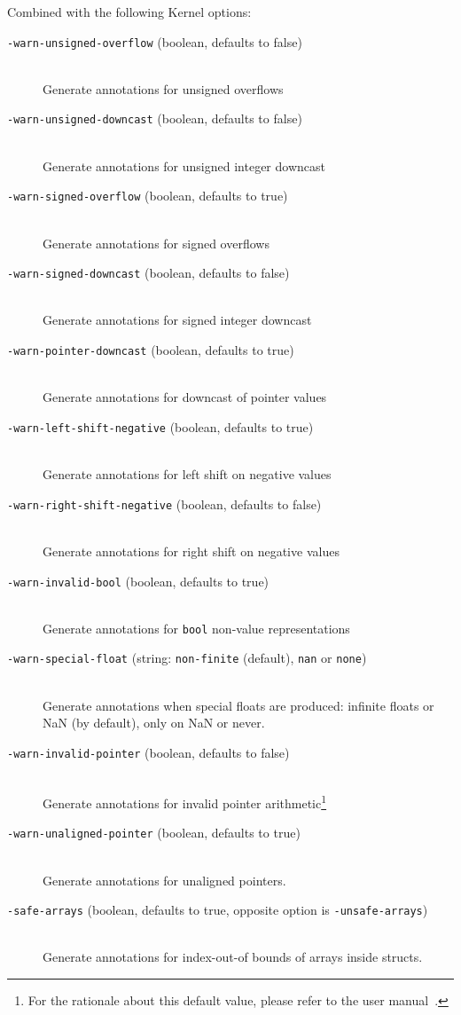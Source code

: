Combined with the following Kernel options:
\begin{description}
\item[{\tt -warn-unsigned-overflow} (boolean, defaults to false)] \ \smallskip \\
     Generate annotations for unsigned overflows
\item[{\tt -warn-unsigned-downcast} (boolean, defaults to false)] \ \smallskip \\
     Generate annotations for unsigned integer downcast
\item[{\tt -warn-signed-overflow} (boolean, defaults to true)] \ \smallskip \\
     Generate annotations for signed overflows
\item[{\tt -warn-signed-downcast} (boolean, defaults to false)] \ \smallskip \\
     Generate annotations for signed integer downcast
\item[{\tt -warn-pointer-downcast} (boolean, defaults to true)] \ \smallskip \\
     Generate annotations for downcast of pointer values
\item[{\tt -warn-left-shift-negative} (boolean, defaults to true)] \ \smallskip \\
     Generate annotations for left shift on negative values
\item[{\tt -warn-right-shift-negative} (boolean, defaults to false)] \ \smallskip \\
     Generate annotations for right shift on negative values
\item[{\tt -warn-invalid-bool} (boolean, defaults to true)] \ \smallskip \\
     Generate annotations for \lstinline|bool| non-value representations
\item[{\tt -warn-special-float} (string: {\tt non-finite} (default), {\tt nan} or {\tt none})] \ \smallskip \\
     Generate annotations when special floats are produced: infinite floats or
     NaN (by default), only on NaN or never.
\item[{\tt -warn-invalid-pointer} (boolean, defaults to false)] \ \smallskip \\
     Generate annotations for invalid pointer
     arithmetic\footnote{For the rationale about this default value, please refer to
     the \framac{} user manual~\cite{userman}.}
\item[{\tt -warn-unaligned-pointer} (boolean, defaults to true)] \ \smallskip \\
     Generate annotations for unaligned pointers.
\item[{\tt -safe-arrays} (boolean, defaults to true, opposite option is {\tt -unsafe-arrays})] \ \smallskip \\
     Generate annotations for index-out-of bounds of arrays inside structs.
\end{description}

